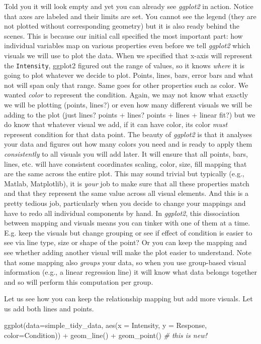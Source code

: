 \documentclass[
]{book}
\newenvironment{Shaded}{\begin{snugshade}}{\end{snugshade}}
\newcommand{\AttributeTok}[1]{\textcolor[rgb]{0.77,0.63,0.00}{#1}}
\newcommand{\CommentTok}[1]{\textcolor[rgb]{0.56,0.35,0.01}{\textit{#1}}}
\newcommand{\FunctionTok}[1]{\textcolor[rgb]{0.00,0.00,0.00}{#1}}
\newcommand{\NormalTok}[1]{#1}
\newcommand{\SpecialCharTok}[1]{\textcolor[rgb]{0.00,0.00,0.00}{#1}}
\begin{document}
Told you it will look empty and yet you can already see \emph{ggplot2} in action. Notice that axes are labeled and their limits are set. You cannot see the legend (they are not plotted without corresponding geometry) but it is also ready behind the scenes. This is because our initial call specified the most important part: how individual variables map on various properties even before we tell \emph{ggplot2} which visuals we will use to plot the data. When we specified that x-axis will represent the \texttt{Intensity}, ggplot2 figured out the range of values, so it knows \emph{where} it is going to plot whatever we decide to plot. Points, lines, bars, error bars and what not will span only that range. Same goes for other properties such as color. We wanted \emph{color} to represent the condition. Again, we may not know what exactly we will be plotting (points, lines?) or even how many different visuals we will be adding to the plot (just lines? points + lines? points + lines + linear fit?) but we do know that whatever visual we add, if it can have color, its color \emph{must} represent condition for that data point. The beauty of \emph{ggplot2} is that it analyses your data and figures out how many colors you need and is ready to apply them \emph{consistently} to all visuals you will add later. It will ensure that all points, bars, lines, etc. will have consistent coordinates scaling, color, size, fill mapping that are the same across the entire plot. This may sound trivial but typically (e.g., Matlab, Matplotlib), it is \emph{your} job to make sure that all these properties match and that they represent the same value across all visual elements. And this is a pretty tedious job, particularly when you decide to change your mappings and have to redo all individual components by hand. In \emph{ggplot2}, this dissociation between mapping and visuals means you can tinker with one of them at a time. E.g. keep the visuals but change grouping or see if effect of condition is easier to see via line type, size or shape of the point? Or you can keep the mapping and see whether adding another visual will make the plot easier to understand. Note that some mapping also \emph{groups} your data, so when you use group-based visual information (e.g., a linear regression line) it will know what data belongs together and so will perform this computation per group.

Let us see how you can keep the relationship mapping but add more visuals. Let us add both lines and points.

\begin{Shaded}
\begin{Highlighting}[]
\FunctionTok{ggplot}\NormalTok{(}\AttributeTok{data=}\NormalTok{simple\_tidy\_data, }\FunctionTok{aes}\NormalTok{(}\AttributeTok{x =}\NormalTok{ Intensity, }\AttributeTok{y =}\NormalTok{ Response, }\AttributeTok{color=}\NormalTok{Condition)) }\SpecialCharTok{+} 
  \FunctionTok{geom\_line}\NormalTok{() }\SpecialCharTok{+}
  \FunctionTok{geom\_point}\NormalTok{() }\CommentTok{\# this is new!}
\end{Highlighting}
\end{Shaded}
\end{document}
